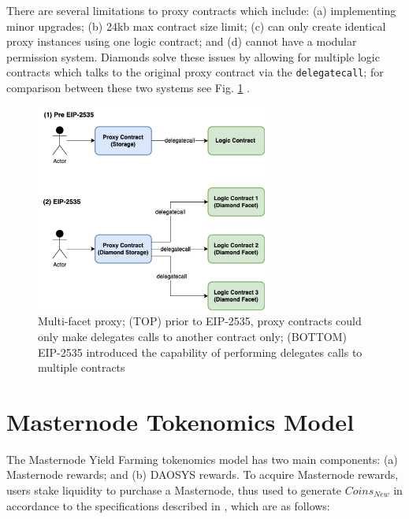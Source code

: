 \documentclass[journal,twocolumn,12pt]{ieeesyscoin}
\begin{document}
There are several limitations to proxy contracts which include: (a) implementing minor upgrades; (b) 24kb max contract size limit; (c) can only create identical proxy instances using one logic contract; and (d) cannot have a modular permission system. Diamonds solve these issues by allowing for multiple logic contracts which talks to the original proxy contract via the \texttt{delegatecall}; for comparison between these two systems see Fig. \ref{fig:diamonds} .

\begin{figure}[h!]
\includegraphics[width=3in]{img/diamonds.png}
\caption{Multi-facet proxy; (TOP) prior to EIP-2535, proxy contracts could only make delegates calls to another contract only; (BOTTOM) EIP-2535 introduced the capability of performing delegates calls to multiple contracts} 
\label{fig:diamonds}
\end{figure} 

\section{Masternode Tokenomics Model}
\label{sec:masternode_tokenomics}

The Masternode Yield Farming tokenomics model has two main components: (a) Masternode rewards; and (b) DAOSYS rewards. To acquire Masternode rewards, users stake liquidity to purchase a Masternode, thus used to generate $Coins_{New}$ in accordance to the specifications described in \cite{Sig21b}, which are as follows:
\end{document}
